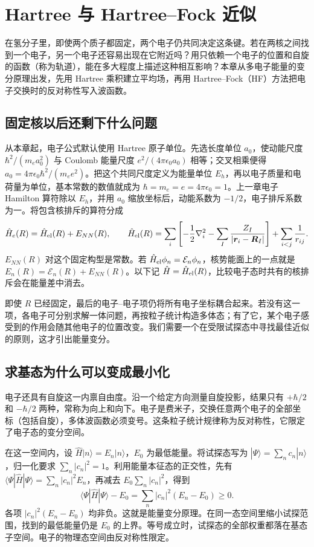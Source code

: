 \chapter{Hartree 与 Hartree--Fock 近似}
在氢分子里，即使两个质子都固定，两个电子仍共同决定这条键。若在两核之间找到一个电子，另一个电子还容易出现在它附近吗？用只依赖一个电子的位置和自旋的函数（称为轨道），能在多大程度上描述这种相互影响？本章从多电子能量的变分原理出发，先用 Hartree 乘积建立平均场，再用 Hartree--Fock（HF）方法把电子交换时的反对称性写入波函数。

\section{固定核以后还剩下什么问题}
从本章起，电子公式默认使用 Hartree 原子单位。先选长度单位 $a_0$，使动能尺度 $\hbar^2/(m_ea_0^2)$ 与 Coulomb 能量尺度 $e^2/(4\pi\epsilon_0a_0)$ 相等；交叉相乘便得 $a_0=4\pi\epsilon_0\hbar^2/(m_e e^2)$。把这个共同尺度定义为能量单位 $E_h$，再以电子质量和电荷量为单位，基本常数的数值就成为 $\hbar=m_e=e=4\pi\epsilon_0=1$。上一章电子 Hamilton 算符除以 $E_h$，并用 $a_0$ 缩放坐标后，动能系数为 $-1/2$，电子排斥系数为一。将包含核排斥的算符分成
\begin{equation}
\hat H_e(R)=\hat H_{\rm el}(R)+E_{NN}(R),\qquad
\hat H_{\rm el}(R)=\sum_i\left[-\frac12\nabla_i^2-\sum_I\frac{Z_I}{|\bm r_i-\bm R_I|}\right]+\sum_{i<j}\frac1{r_{ij}}.
\end{equation}
$E_{NN}(R)$ 对这个固定构型是常数。若 $\hat H_{\rm el}\phi_n=\mathcal E_n\phi_n$，核势能面上的一点就是 $E_n(R)=\mathcal E_n(R)+E_{NN}(R)$。以下记 $\hat H=\hat H_{\rm el}(R)$，比较电子态时共有的核排斥会在能量差中消去。

即使 $R$ 已经固定，最后的电子--电子项仍将所有电子坐标耦合起来。若没有这一项，各电子可分别求解一体问题，再按粒子统计构造多体态；有了它，某个电子感受到的作用会随其他电子的位置改变。我们需要一个在受限试探态中寻找最佳近似的原则，这才引出能量变分。

\section{求基态为什么可以变成最小化}

电子还具有自旋这一内禀自由度。沿一个给定方向测量自旋投影，结果只有 $+\hbar/2$ 和 $-\hbar/2$ 两种，常称为向上和向下。电子是费米子，交换任意两个电子的全部坐标（包括自旋），多体波函数必须变号。这条粒子统计规律称为反对称性，它限定了电子态的变分空间。

在这一空间内，设 $\hat H|n\rangle=E_n|n\rangle$，$E_0$ 为最低能量。将试探态写为 $|\Psi\rangle=\sum_nc_n|n\rangle$，归一化要求 $\sum_n|c_n|^2=1$。利用能量本征态的正交性，先有 $\langle\Psi|\hat H|\Psi\rangle=\sum_n|c_n|^2E_n$，再减去 $E_0\sum_n|c_n|^2$，得到
\begin{equation}
\langle\Psi|\hat H|\Psi\rangle-E_0=\sum_n|c_n|^2(E_n-E_0)\ge0.
\end{equation}
各项 $|c_n|^2(E_n-E_0)$ 均非负。这就是能量变分原理。在同一态空间里缩小试探范围，找到的最低能量仍是 $E_0$ 的上界。等号成立时，试探态的全部权重都落在基态子空间。电子的物理态空间由反对称性限定。

